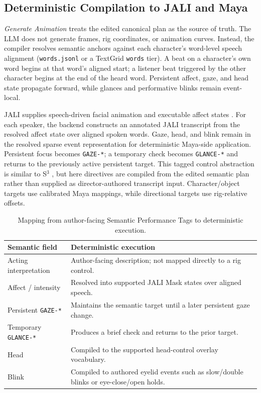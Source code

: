 \subsection{Deterministic Compilation to JALI and Maya}

\textit{Generate Animation} treats the edited canonical plan as the source of truth. The LLM does not generate frames, rig coordinates, or animation curves. Instead, the compiler resolves semantic anchors against each character's word-level speech alignment (\texttt{words.jsonl} or a TextGrid \texttt{words} tier). A beat on a character's own word begins at that word's aligned start; a listener beat triggered by the other character begins at the end of the heard word. Persistent affect, gaze, and head state propagate forward, while glances and performative blinks remain event-local.

JALI supplies speech-driven facial animation and executable affect states \cite{edwards2016jali}. For each speaker, the backend constructs an annotated JALI transcript from the resolved affect state over aligned spoken words. Gaze, head, and blink remain in the resolved sparse event representation for deterministic Maya-side application. Persistent focus becomes \texttt{GAZE-*}; a temporary check becomes \texttt{GLANCE-*} and returns to the previously active persistent target. This tagged control abstraction is similar to S$^3$ \cite{pan2024s3}, but here directives are compiled from the edited semantic plan rather than supplied as director-authored transcript input. Character/object targets use calibrated Maya mappings, while directional targets use rig-relative offsets.

\begin{table}[t]
    \centering
    \caption{Mapping from author-facing Semantic Performance Tags to deterministic execution.}
    \label{tab:jiali-mapping}
    \begin{tabular}{p{} p{}}
        \toprule
        \textbf{Semantic field} & \textbf{Deterministic execution} \\
        \midrule
        Acting interpretation &
        Author-facing description; not mapped directly to a rig control. \\

        Affect / intensity &
        Resolved into supported JALI Mask states over aligned speech. \\

        Persistent \texttt{GAZE-*} &
        Maintains the semantic target until a later persistent gaze change. \\

        Temporary \texttt{GLANCE-*} &
        Produces a brief check and returns to the prior target. \\

        Head &
        Compiled to the supported head-control overlay vocabulary. \\

        Blink &
        Compiled to authored eyelid events such as slow/double blinks or eye-close/open holds. \\
        \bottomrule
    \end{tabular}
\end{table}

